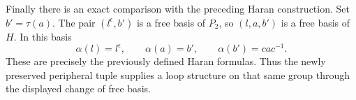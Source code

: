 Finally there is an exact comparison with the preceding Haran
construction.  Set $b'=\tau(a)$.  The pair $(l^\epsilon,b')$
is a free basis of $P_2$, so $(l,a,b')$ is a free basis of $H$.
In this basis
\[
 \alpha(l)=l^\epsilon,\qquad
 \alpha(a)=b',\qquad
 \alpha(b')=c a c^{-1}.
\]
These are precisely the previously defined Haran formulas.  Thus
the newly preserved peripheral tuple supplies a loop structure on
that same group through the displayed change of free basis.
